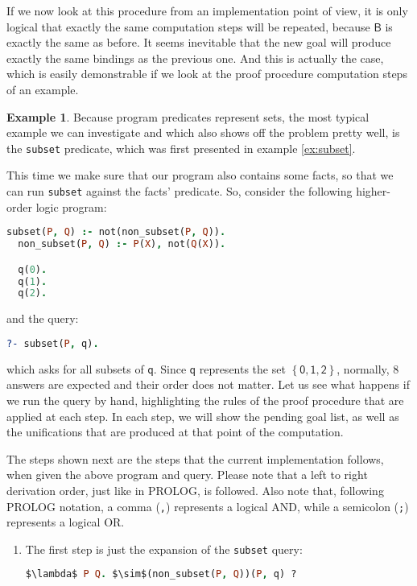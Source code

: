 \documentclass[inscr,ack,preface]{dithesis}
\theoremstyle{definition}
\newtheorem{example}{Example}[chapter]
\newcommand{\msf}[1]{$\mathsf{#1}$}
\begin{document}
If we now look at this procedure from an implementation point of view, it is only logical that exactly the same computation steps will be repeated, because \msf{B} is exactly the same as before. It seems inevitable that the new goal will produce exactly the same bindings as the previous one. And this is actually the case, which is easily demonstrable if we look at the proof procedure computation steps of an example.

\begin{example}
\label{ex:subsettrace}
Because program predicates represent sets, the most typical example we can investigate and which also shows off the problem pretty well, is the \texttt{subset} predicate, which was first presented in example \ref{ex:subset}.

This time we make sure that our program also contains some facts, so that we can run \texttt{subset} against the facts' predicate. So, consider the following higher-order logic program:
\begin{lstlisting}[language=Prolog,frame=single]
  subset(P, Q) :- not(non_subset(P, Q)).
  non_subset(P, Q) :- P(X), not(Q(X)).

  q(0).
  q(1).
  q(2).
\end{lstlisting}
and the query:
\begin{lstlisting}[language=Prolog,frame=single]
  ?- subset(P, q).
\end{lstlisting}
which asks for all subsets of \msf{q}. Since \msf{q} represents the set \msf{\left\{ 0, 1, 2 \right\}}, normally, 8 answers are expected and their order does not matter. Let us see what happens if we run the query by hand, highlighting the rules of the proof procedure that are applied at each step. In each step, we will show the pending goal list, as well as the unifications that are produced at that point of the computation.

The steps shown next are the steps that the current implementation follows, when given the above program and query. Please note that a left to right derivation order, just like in PROLOG, is followed. Also note that, following PROLOG notation, a comma (\texttt{,}) represents a logical AND, while a semicolon (\texttt{;}) represents a logical OR.

\begin{enumerate}
\item The first step is just the expansion of the \texttt{subset} query:
\begin{lstlisting}[language=Prolog,%
  frame=single,breaklines=false,mathescape=true]
  $\lambda$ P Q. $\sim$(non_subset(P, Q))(P, q) ?
\end{lstlisting}


\end{enumerate}
\end{example}
\end{document}
